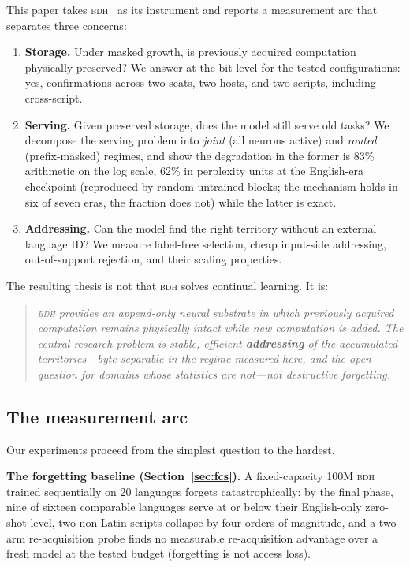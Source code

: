 \documentclass[11pt]{article}
\theoremstyle{definition}\newtheorem{definition}{Definition}
\theoremstyle{remark}\newtheorem{remark}{Remark}
\newcommand{\BDH}{\textsc{bdh}}
\begin{document}
This paper takes \BDH{}~\cite{bdh} as its instrument and reports a measurement arc that separates three concerns:

\begin{enumerate}
\item \textbf{Storage.} Under masked growth, is previously acquired computation physically preserved? We answer at the bit level for the tested configurations: yes, confirmations across two seats, two hosts, and two scripts, including cross-script.
\item \textbf{Serving.} Given preserved storage, does the model still serve old tasks? We decompose the serving problem into \emph{joint} (all neurons active) and \emph{routed} (prefix-masked) regimes, and show the degradation in the former is 83\% arithmetic on the log scale, 62\% in perplexity units at the English-era checkpoint (reproduced by random untrained blocks; the mechanism holds in six of seven eras, the fraction does not) while the latter is exact.
\item \textbf{Addressing.} Can the model find the right territory without an external language ID? We measure label-free selection, cheap input-side addressing, out-of-support rejection, and their scaling properties.
\end{enumerate}

The resulting thesis is not that \BDH{} solves continual learning. It is:

\begin{quote}\itshape
\BDH{} provides an append-only neural substrate in which previously acquired computation remains physically intact while new computation is added. The central research problem is stable, efficient \textbf{addressing} of the accumulated territories---byte-separable in the regime measured here, and the open question for domains whose statistics are not---not destructive forgetting.
\end{quote}

\subsection{The measurement arc}

Our experiments proceed from the simplest question to the hardest.

\textbf{The forgetting baseline (Section~\ref{sec:fcs}).} A fixed-capacity 100M \BDH{} trained sequentially on 20 languages forgets catastrophically: by the final phase, nine of sixteen comparable languages serve at or below their English-only zero-shot level, two non-Latin scripts collapse by four orders of magnitude, and a two-arm re-acquisition probe finds no measurable re-acquisition advantage over a fresh model at the tested budget (forgetting is not access loss).
\end{document}
